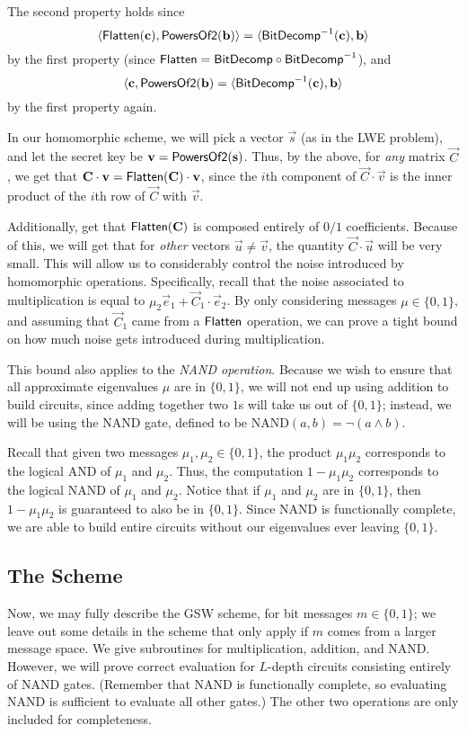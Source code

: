     The second property holds since
    \[\langle {\sf Flatten}(\vec{c}), {\sf PowersOf2}(\vec{b}) \rangle = \langle {\sf BitDecomp}\inv(\vec{c}), \vec{b} \rangle\]
    by the first property (since ${\sf Flatten} = {\sf BitDecomp} \circ {\sf BitDecomp}\inv$), and
    \[\langle \vec{c}, {\sf PowersOf2}(\vec{b}) = \langle {\sf BitDecomp}\inv(\vec{c}), \vec{b} \rangle\]
    by the first property again.


    In our homomorphic scheme, we will pick a vector $\vec{s}$ (as in the LWE problem), and let the secret key be $\vec{v} = {\sf PowersOf2}(\vec{s})$. Thus, by the above, for \emph{any} matrix $\vec{C}$, we get that $\vec{C} \cdot \vec{v} = {\sf Flatten}(\vec{C}) \cdot \vec{v}$, since the $i$th component of $\vec{C} \cdot \vec{v}$ is the inner product of the $i$th row of $\vec{C}$ with $\vec{v}$.

    Additionally, get that ${\sf Flatten}(\vec{C})$ is composed entirely of $0/1$ coefficients. Because of this, we will get that for \emph{other} vectors $\vec{u} \neq \vec{v}$, the quantity $\vec{C} \cdot \vec{u}$ will be very small. This will allow us to considerably control the noise introduced by homomorphic operations. Specifically, recall that the noise associated to multiplication is equal to $\mu_2 \vec{e}_1 + \vec{C}_1 \cdot \vec{e}_2$. By only considering messages $\mu \in \{0,1\}$, and assuming that $\vec{C}_1$ came from a ${\sf Flatten}$ operation, we can prove a tight bound on how much noise gets introduced during multiplication.

    This bound also applies to the \emph{NAND operation}. Because we wish to ensure that all approximate eigenvalues $\mu$ are in $\{0,1\}$, we will not end up using addition to build circuits, since adding together two $1$s will take us out of $\{0,1\}$; instead, we will be using the NAND gate, defined to be NAND$(a, b) = \neg(a \wedge b)$.

    Recall that given two messages $\mu_1, \mu_2 \in \{0,1\}$, the product $\mu_1 \mu_2$ corresponds to the logical AND of $\mu_1$ and $\mu_2$. Thus, the computation $1 - \mu_1 \mu_2$ corresponds to the logical NAND of $\mu_1$ and $\mu_2$. Notice that if $\mu_1$ and $\mu_2$ are in $\{0,1\}$, then $1 - \mu_1 \mu_2$ is guaranteed to also be in $\{0, 1\}$.
    Since NAND is functionally complete, we are able to build entire circuits without our eigenvalues ever leaving $\{0,1\}$.

    \subsection{The Scheme} \label{sec:gswscheme}
    Now, we may fully describe the GSW scheme, for bit messages $m \in \{0, 1\}$; we leave out some details in the scheme that only apply if $m$ comes from a larger message space. We give subroutines for multiplication, addition, and NAND. However, we will prove correct evaluation for $L$-depth circuits consisting entirely of NAND gates. (Remember that NAND is functionally complete, so evaluating NAND is sufficient to evaluate all other gates.) The other two operations are only included for completeness.

